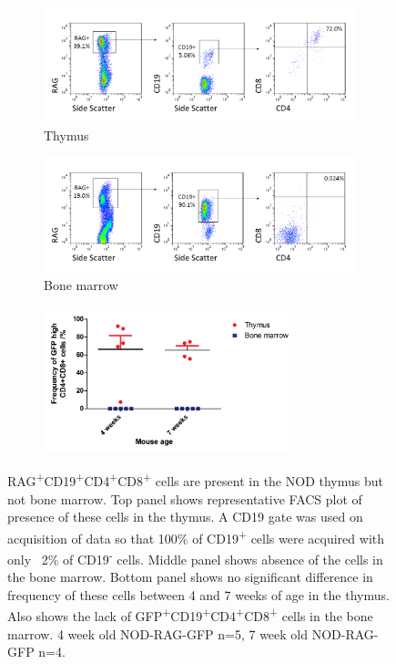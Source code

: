 \begin{figure}	
	\begin{subfigure}{\textwidth}
	\includegraphics[width=\textwidth]{Figures/Thymus1RAGCD19DP.png}
	\caption{Thymus}
	\label{subfig:ThyRAGCD19DP}
	\end{subfigure}
	\begin{subfigure}{\textwidth}
	\includegraphics[width=\textwidth]{Figures/BM1RAGCD19DP.png}
	\caption{Bone marrow}
	\label{subfig:BMRAGCD19DP}
	\end{subfigure}
	\begin{subfigure}{\textwidth}
	\centering
	\includegraphics[width=0.8\textwidth]{Figures/RAGCD19CD4CD8ThyBM.pdf}
	\caption{}
	\label{BMvThyDPgraph}
	\end{subfigure}
\caption[There are GFP\textsuperscript{+}CD19\textsuperscript{+}CD4\textsuperscript{+}CD8\textsuperscript{+} cells present in the NOD thymus] {RAG\textsuperscript{+}CD19\textsuperscript{+}CD4\textsuperscript{+}CD8\textsuperscript{+} cells are present in the NOD thymus but not bone marrow.
Top panel shows representative FACS plot of presence of these cells in the thymus. A CD19 gate was used on acquisition of data so that 100\% of CD19\textsuperscript{+} cells were acquired with only ~2\% of CD19\textsuperscript{-} cells.
Middle panel shows absence of the cells in the bone marrow.
Bottom panel shows no significant difference in frequency of these cells between 4 and 7 weeks of age in the thymus.
Also shows the lack of GFP\textsuperscript{+}CD19\textsuperscript{+}CD4\textsuperscript{+}CD8\textsuperscript{+} cells in the bone marrow.
4 week old NOD-RAG-GFP n=5, 7 week old NOD-RAG-GFP n=4.}
\label{fig:RAGCD19DP}
\end{figure}

